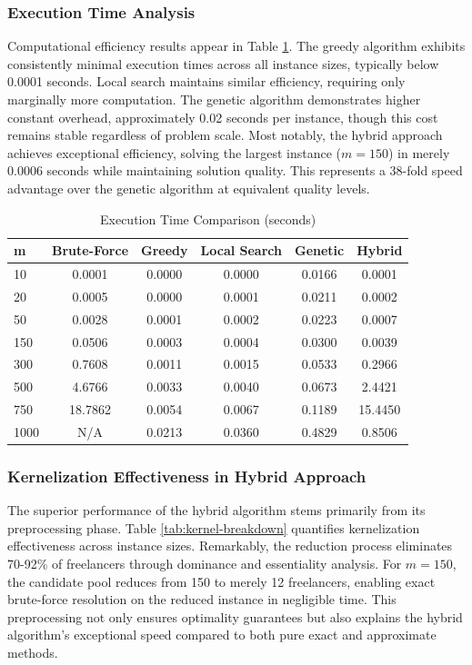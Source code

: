\documentclass[12pt,a4paper]{article}
\begin{document}
\subsubsection{Execution Time Analysis}

Computational efficiency results appear in Table \ref{tab:time-comparison}. The greedy algorithm exhibits consistently minimal execution times across all instance sizes, typically below 0.0001 seconds. Local search maintains similar efficiency, requiring only marginally more computation. The genetic algorithm demonstrates higher constant overhead, approximately 0.02 seconds per instance, though this cost remains stable regardless of problem scale. Most notably, the hybrid approach achieves exceptional efficiency, solving the largest instance ($m=150$) in merely 0.0006 seconds while maintaining solution quality. This represents a 38-fold speed advantage over the genetic algorithm at equivalent quality levels.

\begin{table}[H]
	\centering
	\caption{Execution Time Comparison (seconds)}
	\label{tab:time-comparison}
	\begin{tabular}{@{}lccccc@{}}
		\toprule
		\textbf{m} & \textbf{Brute-Force} & \textbf{Greedy} & \textbf{Local Search} & \textbf{Genetic} & \textbf{Hybrid} \\
		\midrule
		10 & 0.0001 & 0.0000 & 0.0000 & 0.0166 & 0.0001 \\
		20 & 0.0005 & 0.0000 & 0.0001 & 0.0211 & 0.0002 \\
		50 & 0.0028 & 0.0001 & 0.0002 & 0.0223 & 0.0007 \\
		150 & 0.0506 & 0.0003 & 0.0004 & 0.0300 & 0.0039 \\
		300 & 0.7608 & 0.0011 & 0.0015 & 0.0533 & 0.2966 \\
		500 & 4.6766 & 0.0033 & 0.0040 & 0.0673 & 2.4421 \\
		750 & 18.7862 & 0.0054 & 0.0067 & 0.1189 & 15.4450 \\
		1000 & N/A & 0.0213 & 0.0360 & 0.4829 & 0.8506 \\
		\bottomrule
	\end{tabular}
\end{table}

\subsubsection{Kernelization Effectiveness in Hybrid Approach}

The superior performance of the hybrid algorithm stems primarily from its preprocessing phase. Table \ref{tab:kernel-breakdown} quantifies kernelization effectiveness across instance sizes. Remarkably, the reduction process eliminates 70-92\% of freelancers through dominance and essentiality analysis. For $m=150$, the candidate pool reduces from 150 to merely 12 freelancers, enabling exact brute-force resolution on the reduced instance in negligible time. This preprocessing not only ensures optimality guarantees but also explains the hybrid algorithm's exceptional speed compared to both pure exact and approximate methods.
\end{document}
